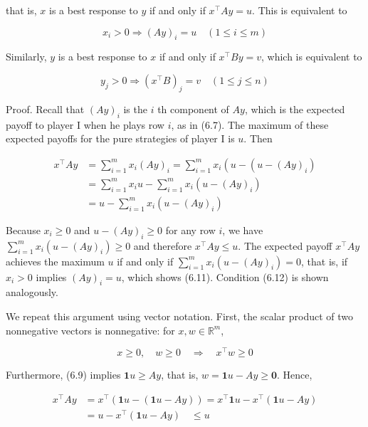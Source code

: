 \documentclass[12pt]{article}
\begin{document}
that is, $x$ is a best response to $y$ if and only if $x^{\top} A y=u$. This is equivalent to


\begin{equation*}
x_{i}>0 \Rightarrow(A y)_{i}=u \quad(1 \leq i \leq m) \tag{6.11}
\end{equation*}


Similarly, $y$ is a best response to $x$ if and only if $x^{\top} B y=v$, which is equivalent to


\begin{equation*}
y_{j}>0 \Rightarrow\left(x^{\top} B\right)_{j}=v \quad(1 \leq j \leq n) \tag{6.12}
\end{equation*}


Proof. Recall that $(A y)_{i}$ is the $i$ th component of $A y$, which is the expected payoff to player I when he plays row $i$, as in (6.7). The maximum of these expected payoffs for the pure strategies of player I is $u$. Then


\begin{align*}
x^{\top} A y & =\sum_{i=1}^{m} x_{i}(A y)_{i}=\sum_{i=1}^{m} x_{i}\left(u-\left(u-(A y)_{i}\right)\right. \\
& =\sum_{i=1}^{m} x_{i} u-\sum_{i=1}^{m} x_{i}\left(u-(A y)_{i}\right) \\
& =u-\sum_{i=1}^{m} x_{i}\left(u-(A y)_{i}\right) \tag{6.13}
\end{align*}


Because $x_{i} \geq 0$ and $u-(A y)_{i} \geq 0$ for any row $i$, we have $\sum_{i=1}^{m} x_{i}\left(u-(A y)_{i}\right) \geq 0$ and therefore $x^{\top} A y \leq u$. The expected payoff $x^{\top} A y$ achieves the maximum $u$ if and only if $\sum_{i=1}^{m} x_{i}\left(u-(A y)_{i}\right)=0$, that is, if $x_{i}>0$ implies $(A y)_{i}=u$, which shows (6.11). Condition (6.12) is shown analogously.

We repeat this argument using vector notation. First, the scalar product of two nonnegative vectors is nonnegative: for $x, w \in \mathbb{R}^{m}$,


\begin{equation*}
x \geq 0, \quad w \geq 0 \quad \Rightarrow \quad x^{\top} w \geq 0 \tag{6.14}
\end{equation*}


Furthermore, (6.9) implies $\mathbf{1} u \geq A y$, that is, $w=\mathbf{1} u-A y \geq \mathbf{0}$. Hence,


\begin{align*}
x^{\top} A y & =x^{\top}(\mathbf{1} u-(\mathbf{1} u-A y))=x^{\top} \mathbf{1} u-x^{\top}(\mathbf{1} u-A y) \\
& =u-x^{\top}(\mathbf{1} u-A y) \quad \leq u \tag{6.15}
\end{align*}
\end{document}
